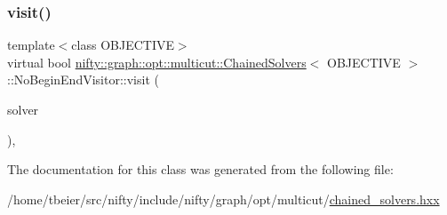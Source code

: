\mbox{\label{classnifty_1_1graph_1_1opt_1_1multicut_1_1ChainedSolvers_1_1NoBeginEndVisitor_aaa4630cbce178d0007e625a465a40303}} 
\subsubsection{\texorpdfstring{visit()}{visit()}}
{\footnotesize\ttfamily template$<$class O\+B\+J\+E\+C\+T\+I\+VE$>$ \\
virtual bool \hyperlink{classnifty_1_1graph_1_1opt_1_1multicut_1_1ChainedSolvers}{nifty\+::graph\+::opt\+::multicut\+::\+Chained\+Solvers}$<$ O\+B\+J\+E\+C\+T\+I\+VE $>$\+::No\+Begin\+End\+Visitor\+::visit (\begin{DoxyParamCaption}\item[{\hyperlink{classnifty_1_1graph_1_1opt_1_1multicut_1_1ChainedSolvers_a77e11f6353ef773b9570eb302158bc12}{Base\+Type} $\ast$}]{solver }\end{DoxyParamCaption})\hspace{0.3cm}{\ttfamily [inline]}, {\ttfamily [virtual]}}



The documentation for this class was generated from the following file\+:\begin{DoxyCompactItemize}
\item 
/home/tbeier/src/nifty/include/nifty/graph/opt/multicut/\hyperlink{multicut_2chained__solvers_8hxx}{chained\+\_\+solvers.\+hxx}\end{DoxyCompactItemize}
